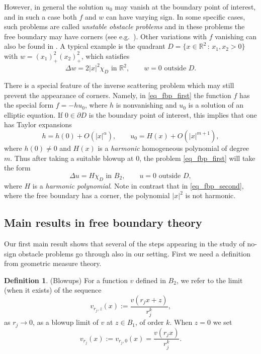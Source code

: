 \documentclass[11pt,a4paper]{amsart}
\theoremstyle{definition}
\newtheorem{Definition}[Theorem]{Definition}
\numberwithin{equation}{section}
\newcommand{\mR}{\mathbb{R}}                    %
\newcommand{\p}{\partial}
\begin{document}
However, in general the solution $u_0$ may vanish at the boundary point of interest, and in such a case both $f$ and $w$ can have varying sign. 
In some specific cases, such problems are  called \emph{unstable obstacle problems} and in these problems the free boundary may have corners (see e.g.\ \cite{And-Sh-W2012}). Other variations with $f$ vanishing can also be found in  \cite{Yeressian}. 
A typical example is the quadrant $D = \{ x \in \mR^2 \,:\, x_1, x_2 > 0 \}$ with $w = (x_1)_+^2 (x_2)_+^2$, which satisfies 
\begin{equation} \label{eq_fbp_second}
\Delta w = 2 |x|^2 \chi_D \text{ in $\mR^2$}, \qquad w = 0 \text{ outside $D$.}
\end{equation}

There is a special feature of the inverse scattering problem which may still prevent the appearance of corners. Namely, in \eqref{eq_fbp_first} the function $f$ has the special form $f = -h u_0$, where $h$ is nonvanishing and $u_0$ is a solution of an elliptic equation. If $0 \in \p D$ is the boundary point of interest, this implies that one has Taylor expansions 
\[
h = h(0) + O(|x|^{\alpha}), \qquad u_0 = H(x) + O(|x|^{m+1}),
\]
where $h(0) \neq 0$ and $H(x)$ is a \emph{harmonic} homogeneous polynomial of degree $m$. Thus after taking a suitable blowup at $0$, the problem \eqref{eq_fbp_first} will take the form 
\[
\Delta u = H \chi_D \text{ in $B_2$}, \qquad u = 0 \text{ outside $D$},
\]
where $H$ is a \emph{harmonic polynomial}. Note in contrast that in \eqref{eq_fbp_second}, where the free boundary has a corner, the polynomial $|x|^2$ is not harmonic.


\subsection{Main results in free boundary theory}



Our first main result shows that several of the steps appearing in the study of no-sign obstacle problems go through also in our setting. First we need a definition from geometric measure theory.


\begin{Definition}\label{def:blowup}(Blowups)
 For a function $v$ defined in $B_2$, we refer to the limit (when it exists) of the sequence
$$
v_{r_j,z}(x) := \frac{v(r_jx + z)}{r_j^k },
$$
as $r_j \to 0$, as a blowup limit of $v$ at $z \in B_{1}$, of order $k$. When $z=0$ we set 
$$
v_{r_j}(x):= v_{r_j,0}(x) = \frac{v(r_jx )}{r_j^k }.
$$
\end{Definition}
\end{document}
